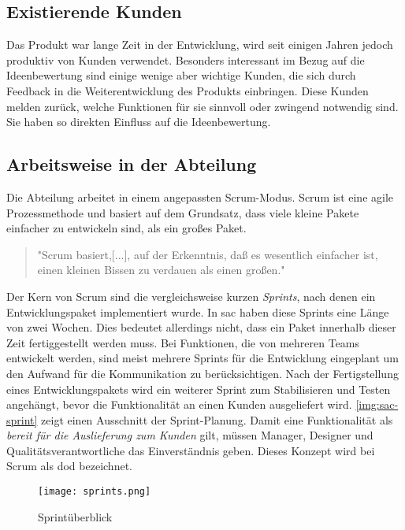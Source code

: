 \subsection{Existierende Kunden}
Das Produkt war lange Zeit in der Entwicklung, wird seit einigen Jahren jedoch produktiv von Kunden verwendet. Besonders 
interessant im Bezug auf die Ideenbewertung sind einige wenige aber wichtige Kunden, die sich durch Feedback in die 
Weiterentwicklung des Produkts einbringen. Diese Kunden melden zurück, welche Funktionen für sie sinnvoll oder 
zwingend notwendig sind. Sie haben so direkten Einfluss auf die Ideenbewertung. 

\subsection{Arbeitsweise in der Abteilung}
Die Abteilung arbeitet in einem angepassten Scrum-Modus. Scrum ist eine agile Prozessmethode und basiert 
auf dem Grundsatz, dass viele kleine Pakete einfacher zu entwickeln sind, als ein großes Paket. 
\begin{quote} "Scrum basiert,[...], auf der Erkenntnis, daß es wesentlich einfacher ist, einen kleinen Bissen zu verdauen als einen großen."\cite{scrum:2018} \end{quote} 
Der Kern von Scrum sind die vergleichsweise kurzen \textit{Sprints}, nach denen ein Entwicklungspaket implementiert wurde. 
In \ac{sac} haben diese Sprints eine Länge von zwei Wochen. Dies bedeutet allerdings nicht, dass ein Paket 
innerhalb dieser Zeit fertiggestellt werden muss. 
Bei Funktionen, die von mehreren Teams entwickelt werden, sind meist mehrere Sprints für die Entwicklung eingeplant um den Aufwand für die Kommunikation zu berücksichtigen. 
Nach der Fertigstellung eines Entwicklungspakets wird ein weiterer Sprint zum Stabilisieren und Testen angehängt, bevor die Funktionalität an einen Kunden
ausgeliefert wird. \autoref{img:sac-sprint} zeigt einen Ausschnitt der Sprint-Planung.
Damit eine Funktionalität als \textit{bereit für die Auslieferung zum Kunden} gilt, müssen Manager, Designer und Qualitätsverantwortliche das 
Einverständnis geben. Dieses Konzept wird bei Scrum als \ac{dod} bezeichnet. 
\begin{figure}[h]
	\centering
	\texttt{[image: sprints.png]}
	\caption{Sprintüberblick}
	\label{img:sac-sprint}
\end{figure}



